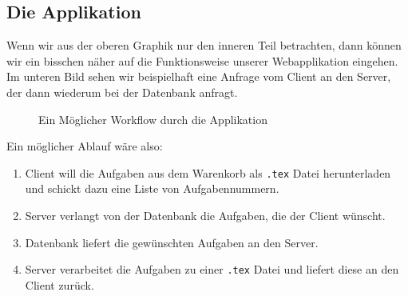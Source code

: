 \subsection{Die Applikation}

Wenn wir aus der oberen Graphik nur den inneren Teil betrachten, dann können wir ein bisschen näher auf die Funktionsweise unserer Webapplikation eingehen. Im unteren Bild sehen wir beispielhaft eine Anfrage vom Client an den Server, der dann wiederum bei der Datenbank anfragt.

\begin{figure}
    \caption{Ein Möglicher Workflow durch die Applikation \cite{fig:workflow}}
\end{figure}
Ein möglicher Ablauf wäre also:
\begin{enumerate}
    \item Client will die Aufgaben aus dem Warenkorb als \verb|.tex| Datei herunterladen und schickt dazu eine Liste von Aufgabennummern.
    \item Server verlangt von der Datenbank die Aufgaben, die der Client wünscht.
    \item Datenbank liefert die gewünschten Aufgaben an den Server.
    \item Server verarbeitet die Aufgaben zu einer \verb|.tex| Datei und liefert diese an den Client zurück.
\end{enumerate}